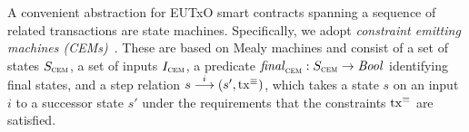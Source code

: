 


A convenient abstraction for EUTxO smart contracts spanning a sequence
of related transactions are state machines. Specifically, we adopt
\emph{constraint emitting machines (CEMs)}~\cite{eutxo}. These are
based on Mealy machines and consist of a set of states $S_{\textsc{cem}}$, a set
of inputs $I_{\textsc{cem}}$, a predicate \(\mathit{final}_{\textsc{cem}} : S_{\textsc{cem}}\to\mathit{Bool}\)
identifying final states, and a step relation
\({s}\overset{i}\longrightarrow(s', \mathrm{tx}^\equiv)\), which takes a state $s$ on an
input $i$ to a successor state $s'$ under the requirements that the
constraints $\mathrm{tx}^\equiv$ are satisfied.

